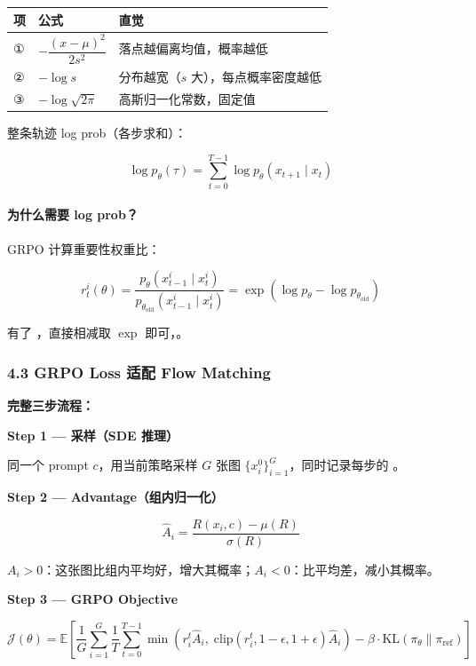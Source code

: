 \begin{center}
\begin{tabular}{p{0.5cm}p{4cm}p{6cm}}
\hline
项 & 公式 & 直觉 \\
\hline
① & $-\dfrac{(x-\mu)^2}{2s^2}$ & 落点越偏离均值，概率越低 \\[4pt]
② & $-\log s$ & 分布越宽（$s$ 大），每点概率密度越低 \\
③ & $-\log\sqrt{2\pi}$ & 高斯归一化常数，固定值 \\
\hline
\end{tabular}
\end{center}

整条轨迹 log prob（各步求和）：

\[
\log p_\theta(\tau) = \sum_{t=0}^{T-1} \log p_\theta(x_{t+1} \mid x_t)
\]

\paragraph{为什么需要 log prob？}

GRPO 计算重要性权重比：

\[
r_t^i(\theta) = \frac{p_\theta(x_{t-1}^i \mid x_t^i)}{p_{\theta_{\text{old}}}(x_{t-1}^i \mid x_t^i)} = \exp\!\left(\log p_\theta - \log p_{\theta_{\text{old}}}\right)
\]

有了 ，直接相减取 $\exp$ 即可，。

\subsubsection{4.3 GRPO Loss 适配 Flow Matching}

\textbf{完整三步流程：}

\textbf{Step 1 — 采样（SDE 推理）}

同一个 prompt $c$，用当前策略采样 $G$ 张图 $\{x_i^0\}_{i=1}^G$，同时记录每步的 。

\textbf{Step 2 — Advantage（组内归一化）}

\[
\hat{A}_i = \frac{R(x_i, c) - \mu(R)}{\sigma(R)}
\]

$A_i > 0$：这张图比组内平均好，增大其概率；$A_i < 0$：比平均差，减小其概率。

\textbf{Step 3 — GRPO Objective}

\[
\mathcal{J}(\theta) = \mathbb{E}\left[\frac{1}{G}\sum_{i=1}^G \frac{1}{T}\sum_{t=0}^{T-1} \min\!\left(r_i^t \hat{A}_i,\; \text{clip}(r_i^t, 1-\epsilon, 1+\epsilon)\hat{A}_i\right) - \beta \cdot \text{KL}(\pi_\theta \| \pi_{\text{ref}})\right]
\]

